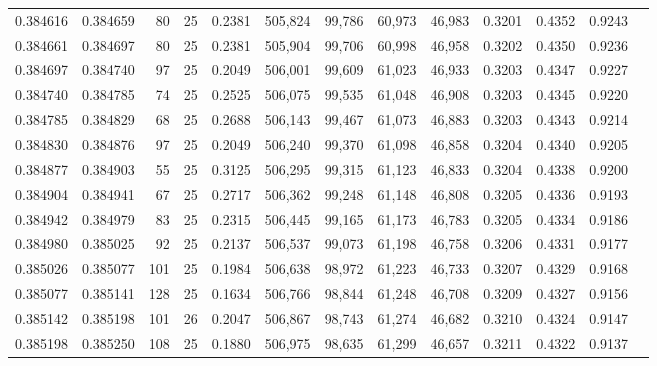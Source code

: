 \begin{tabular}{rrrrrrrrrrrrr}
0.384616 & 0.384659 &    80 &  25 &                                     0.2381 & 505,824 &  99,786 &  60,973 &  46,983 & 0.3201 & 0.4352 & 0.9243 \\
0.384661 & 0.384697 &    80 &  25 &                                     0.2381 & 505,904 &  99,706 &  60,998 &  46,958 & 0.3202 & 0.4350 & 0.9236 \\
0.384697 & 0.384740 &    97 &  25 &                                     0.2049 & 506,001 &  99,609 &  61,023 &  46,933 & 0.3203 & 0.4347 & 0.9227 \\
0.384740 & 0.384785 &    74 &  25 &                                     0.2525 & 506,075 &  99,535 &  61,048 &  46,908 & 0.3203 & 0.4345 & 0.9220 \\
0.384785 & 0.384829 &    68 &  25 &                                     0.2688 & 506,143 &  99,467 &  61,073 &  46,883 & 0.3203 & 0.4343 & 0.9214 \\
0.384830 & 0.384876 &    97 &  25 &                                     0.2049 & 506,240 &  99,370 &  61,098 &  46,858 & 0.3204 & 0.4340 & 0.9205 \\
0.384877 & 0.384903 &    55 &  25 &                                     0.3125 & 506,295 &  99,315 &  61,123 &  46,833 & 0.3204 & 0.4338 & 0.9200 \\
0.384904 & 0.384941 &    67 &  25 &                                     0.2717 & 506,362 &  99,248 &  61,148 &  46,808 & 0.3205 & 0.4336 & 0.9193 \\
0.384942 & 0.384979 &    83 &  25 &                                     0.2315 & 506,445 &  99,165 &  61,173 &  46,783 & 0.3205 & 0.4334 & 0.9186 \\
0.384980 & 0.385025 &    92 &  25 &                                     0.2137 & 506,537 &  99,073 &  61,198 &  46,758 & 0.3206 & 0.4331 & 0.9177 \\
0.385026 & 0.385077 &   101 &  25 &                                     0.1984 & 506,638 &  98,972 &  61,223 &  46,733 & 0.3207 & 0.4329 & 0.9168 \\
0.385077 & 0.385141 &   128 &  25 &                                     0.1634 & 506,766 &  98,844 &  61,248 &  46,708 & 0.3209 & 0.4327 & 0.9156 \\
0.385142 & 0.385198 &   101 &  26 &                                     0.2047 & 506,867 &  98,743 &  61,274 &  46,682 & 0.3210 & 0.4324 & 0.9147 \\
0.385198 & 0.385250 &   108 &  25 &                                     0.1880 & 506,975 &  98,635 &  61,299 &  46,657 & 0.3211 & 0.4322 & 0.9137 \\

\end{tabular}
